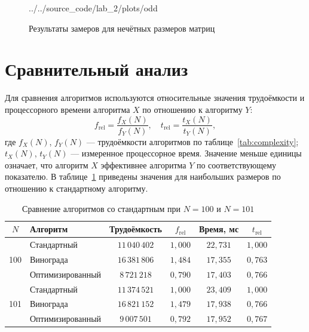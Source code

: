 \documentclass{bmstu}
\begin{document}
\begin{figure}[H]
	\centering
	
	{../../source_code/lab_2/plots/odd}
	\caption{Результаты замеров для нечётных размеров матриц}
	\label{fig:odd-results}
\end{figure}

\section{Сравнительный анализ}
Для сравнения алгоритмов используются относительные значения трудоёмкости и
процессорного времени алгоритма $X$ по отношению к алгоритму $Y$:
\begin{equation}
	\label{eq:relative}
	f_{\mathrm{rel}}=\frac{f_X(N)}{f_Y(N)},\quad
	t_{\mathrm{rel}}=\frac{t_X(N)}{t_Y(N)},
\end{equation}
где $f_X(N)$, $f_Y(N)$ --- трудоёмкости алгоритмов по
таблице~\ref{tab:complexity}; $t_X(N)$, $t_Y(N)$ --- измеренное процессорное
время. Значение меньше единицы означает, что алгоритм $X$ эффективнее алгоритма $Y$ по
соответствующему показателю. В таблице~\ref{tab:compare} приведены значения
для наибольших размеров по отношению к стандартному алгоритму.

\begin{table}[H]
	\centering
	\caption{Сравнение алгоритмов со стандартным при $N=100$ и $N=101$}
	\label{tab:compare}
	\begin{tabular}{|c|l|c|c|c|c|}
		\hline
		$N$                  & Алгоритм         & Трудоёмкость   & $f_{\mathrm{rel}}$ & Время, мс  & $t_{\mathrm{rel}}$ \\ \hline
		\multirow{3}{*}{100} & Стандартный      & $11\,040\,402$ & $1{,}000$          & $22{,}731$ & $1{,}000$          \\ \cline{2-6}
		                     & Винограда        & $16\,381\,806$ & $1{,}484$          & $17{,}355$ & $0{,}763$          \\ \cline{2-6}
		                     & Оптимизированный & $8\,721\,218$  & $0{,}790$          & $17{,}403$ & $0{,}766$          \\ \hline
		\multirow{3}{*}{101} & Стандартный      & $11\,374\,521$ & $1{,}000$          & $23{,}409$ & $1{,}000$          \\ \cline{2-6}
		                     & Винограда        & $16\,821\,152$ & $1{,}479$          & $17{,}938$ & $0{,}766$          \\ \cline{2-6}
		                     & Оптимизированный & $9\,007\,501$  & $0{,}792$          & $17{,}952$ & $0{,}767$          \\ \hline
	\end{tabular}
\end{table}
\end{document}

